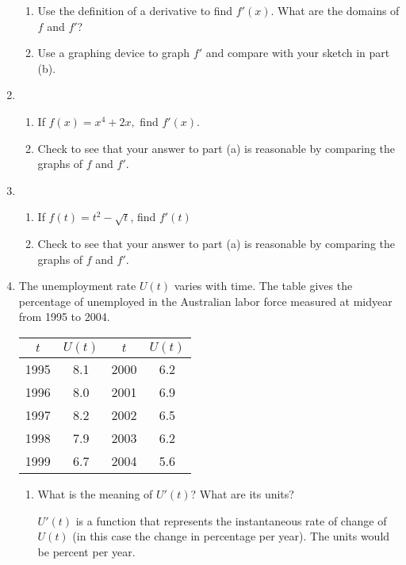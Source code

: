 \documentclass{article}
\begin{document}
\begin{enumerate}
\begin{enumerate}
			\item Use the definition of a derivative to find $f'(x)$. What are 
				the domains of $f$ and $f'$?

			\item Use a graphing device to graph $f'$ and compare with your sketch
				in part (b).	
		\end{enumerate}

		\item
		\begin{enumerate}
			\item If $f(x) = x^4 + 2x,$ find $f'(x)$.

			\item Check to see that your answer to part (a) is reasonable
				by comparing the graphs of $f$ and $f'$.
		\end{enumerate}

		\item	
		\begin{enumerate}
			\item If $f(t) = t^2 - \sqrt{t}$, find $f'(t)$

			\item Check to see that your answer to part (a) is reasonable by
				comparing the graphs of $f$ and $f'$.
		\end{enumerate}

		\item The unemployment rate $U(t)$ varies with time. The table gives the
			percentage of unemployed in the Australian labor force measured
			at midyear from 1995 to 2004.

			\begin{tabular}{|c|c||c|c|}
				\hline
				$t$ & $U(t)$ & $t$ & $U(t)$ \\
				\hline
				1995 & 8.1 & 2000 & 6.2 \\
				1996 & 8.0 & 2001 & 6.9 \\
				1997 & 8.2 & 2002 & 6.5 \\
				1998 & 7.9 & 2003 & 6.2 \\
				1999 & 6.7 & 2004 & 5.6 \\
				\hline
			\end{tabular}

		\begin{enumerate}
			\item What is the meaning of $U'(t)$? What are its units?

				$U'(t)$ is a function that represents the instantaneous
				rate of change of $U(t)$ (in this case the change in percentage
				per year). The units would be percent per year.


\end{enumerate}
\end{enumerate}
\end{document}
